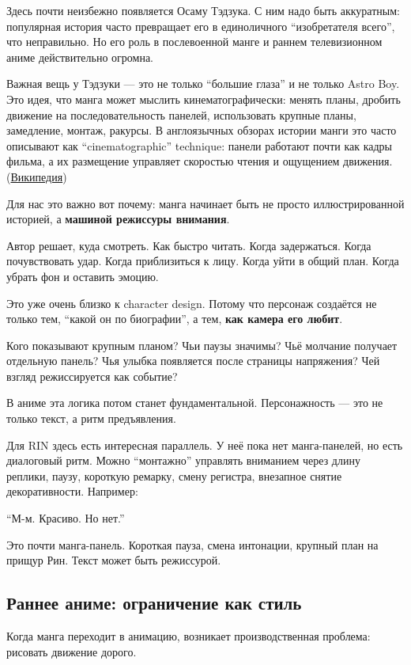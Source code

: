 Здесь почти неизбежно появляется Осаму Тэдзука. С ним надо быть
аккуратным: популярная история часто превращает его в единоличного
``изобретателя всего'', что неправильно. Но его роль в послевоенной
манге и раннем телевизионном аниме действительно огромна.

Важная вещь у Тэдзуки --- это не только ``большие глаза'' и не только
Astro Boy. Это идея, что манга может мыслить кинематографически: менять
планы, дробить движение на последовательность панелей, использовать
крупные планы, замедление, монтаж, ракурсы. В англоязычных обзорах
истории манги это часто описывают как ``cinematographic'' technique:
панели работают почти как кадры фильма, а их размещение управляет
скоростью чтения и ощущением движения.
(\href{https://en.wikipedia.org/wiki/History_of_manga?utm_source=chatgpt.com}{Википедия})

Для нас это важно вот почему: манга начинает быть не просто
иллюстрированной историей, а \textbf{машиной режиссуры внимания}.

Автор решает, куда смотреть. Как быстро читать. Когда задержаться. Когда
почувствовать удар. Когда приблизиться к лицу. Когда уйти в общий план.
Когда убрать фон и оставить эмоцию.

Это уже очень близко к character design. Потому что персонаж создаётся
не только тем, ``какой он по биографии'', а тем, \textbf{как камера его
любит}.

Кого показывают крупным планом? Чьи паузы значимы? Чьё молчание получает
отдельную панель? Чья улыбка появляется после страницы напряжения? Чей
взгляд режиссируется как событие?

В аниме эта логика потом станет фундаментальной. Персонажность --- это
не только текст, а ритм предъявления.

Для RIN здесь есть интересная параллель. У неё пока нет манга-панелей,
но есть диалоговый ритм. Можно ``монтажно'' управлять вниманием через
длину реплики, паузу, короткую ремарку, смену регистра, внезапное снятие
декоративности. Например:

``М-м. Красиво. Но нет.''

Это почти манга-панель. Короткая пауза, смена интонации, крупный план на
прищур Рин. Текст может быть режиссурой.

\subsection*{Раннее аниме: ограничение как стиль}

Когда манга переходит в анимацию, возникает производственная проблема:
рисовать движение дорого.

